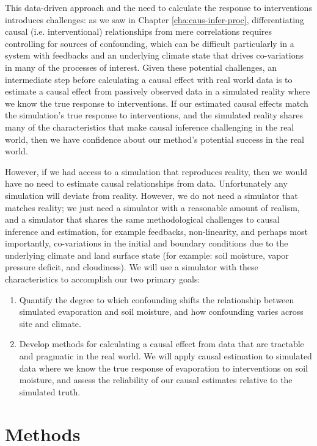 \documentclass[12pt]{article}
\begin{document}
This data-driven approach and the need to calculate the response to
interventions introduces challenges: as we saw in Chapter
\ref{cha:caus-infer-proc}, differentiating causal
(i.e. interventional) relationships from mere correlations requires
controlling for sources of confounding\cite{pearl2009}, which can be
difficult particularly in a system with feedbacks and an underlying
climate state that drives co-variations in many of the processes of
interest. Given these potential challenges, an intermediate step
before calculating a causal effect with real world data is to estimate
a causal effect from passively observed data in a simulated reality
where we know the true response to interventions. If our estimated
causal effects match the simulation's true response to interventions,
and the simulated reality shares many of the characteristics that make
causal inference challenging in the real world, then we have
confidence about our method's potential success in the real world.

However, if we had access to a simulation that reproduces reality,
then we would have no need to estimate causal relationships from data.
Unfortunately any simulation will deviate from reality. However, we do
not need a simulator that matches reality; we just need a simulator
with a reasonable amount of realism, and a simulator that shares the
same methodological challenges to causal inference and estimation, for
example feedbacks, non-linearity, and perhaps most importantly,
co-variations in the initial and boundary conditions due to the
underlying climate and land surface state (for example: soil moisture,
vapor pressure deficit, and cloudiness). We will use a simulator with
these characteristics to accomplish our two primary goals:

\begin{enumerate}
  \item Quantify the degree to which confounding shifts the
    relationship between simulated evaporation and soil moisture, and
    how confounding varies across site and climate.
\item Develop methods for calculating a causal effect from data that
  are tractable and pragmatic in the real world. We will apply causal
  estimation to simulated data where we know the true response of
  evaporation to interventions on soil moisture, and assess the
  reliability of our causal estimates relative to the simulated truth.
\end{enumerate}

\section{Methods}
\label{sec:methods-sm-caus}
\end{document}

